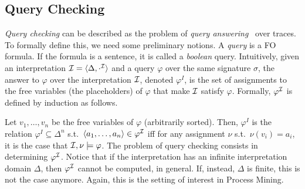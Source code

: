 \subsection{Query Checking}
\emph{Query checking} can be described as the problem of \emph{query
answering}~\cite{vianu-book} over traces.
To formally define this, we need some preliminary notions.
A \emph{query} is a FO formula. If the formula is a sentence, it is called a
\emph{boolean} query. Intuitively, given an interpretation
$\mathcal{I}=\langle \Delta,\cdot^{\mathcal{I}}\rangle$ and a query $\varphi$ over the same signature
$\sigma$,
the answer to $\varphi$ over the interpretation $\mathcal{I}$, denoted  $\varphi^I$, is
the set of assignments to the free variables (the placeholders) of $\varphi$ that make $\mathcal{I}$
satisfy $\varphi$. Formally, $\varphi^{\mathcal{I}}$ is defined by induction as follows.

Let $v_1,\ldots,v_n$ be the free variables of $\varphi$ (arbitrarily sorted).
Then, $\varphi^I$ is the relation $\varphi^I\subseteq \Delta^n$
s.t.~$\langle a_1,\ldots,a_n\rangle\in\varphi^{\mathcal{I}}$ iff for any assignment $\nu$
s.t.~$\nu(v_i)=a_i$, it is the case that $\mathcal{I},\nu\models\varphi$.
The problem of query checking consists in determining $\varphi^{\mathcal{I}}$. Notice that
if the interpretation has an infinite interpretation domain $\Delta$, then
$\varphi^{\mathcal{I}}$ cannot be computed, in general. If, instead, $\Delta$
is finite, this is not the case anymore. Again, this
is the setting of interest in Process Mining.

